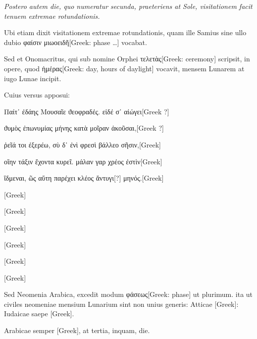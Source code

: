 \textit{Postero autem die, quo numeratur secunda,
 praeteriens at Sole, visitationem
facit tenuem extremae rotundationis.}

Ubi etiam dixit visitationem
extremae rotundationis, quam ille Samius sine ullo dubio
 \textgreek{φαίσιν μιωοειδῆ[Greek: phase …]} vocabat.

Sed et Onomacritus, qui sub nomine Orphei \textgreek{τελετὰς[Greek: ceremony]}
scripsit, in opere, quod
 \textgreek{ἡμέρας[Greek: day, hours of daylight]}
 vocavit, mensem Lunarem at iugo Lunae
incipit.

Cuius versus apposui:

\begin{greek}
Παίτ᾽ ἐδάης Μουσαῖε ϑεοφραδἐς. εἰδέ σ᾽ αἰώγει[Greek ?]

ϑυμὸς ἐπωνυμίας μήνης κατὰ μοῖραν ἀκοῦσαι,[Greek ?]

ῤεῖά τοι ἐξερέω, σὺ δ᾽ ἐνὶ φρεσὶ βάλλεο σῆσιν,[Greek]

οἵην τάξιν ἔχοντα κυρεῖ. μάλαν γαρ χρέος ἐστὶν[Greek]

ἴδμεναι, ῶς αὕτη παρέχει κλέος ἄντυγι[?] μηνός.[Greek]

\textgreek{[Greek]}

\textgreek{[Greek]}

\textgreek{[Greek]}

\textgreek{[Greek]}

\textgreek{[Greek]}

\textgreek{[Greek]}
\end{greek}

Sed Neomenia Arabica, excedit modum
 \textgreek{φάσεως[Greek: phase]} ut plurimum. ita ut
civiles neomeniae mensium Lunarium sint non unius generis: Atticae
\textgreek{[Greek]}: Iudaicae saepe \textgreek{[Greek]}.

Arabicae semper \textgreek{[Greek]},
at tertia, inquam, die.

